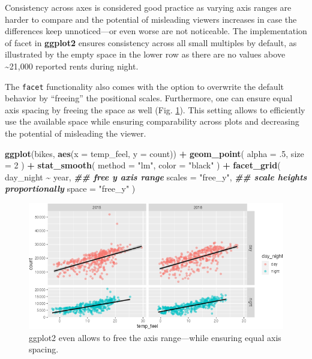 \documentclass[
]{krantz}
\makeatletter
\newenvironment{Shaded}{\begin{snugshade}}{\end{snugshade}}
\newcommand{\AttributeTok}[1]{\textcolor[rgb]{0.27,0.27,0.27}{#1}}
\newcommand{\DecValTok}[1]{\textcolor[rgb]{0.06,0.06,0.06}{#1}}
\newcommand{\DocumentationTok}[1]{\textcolor[rgb]{0.37,0.37,0.37}{\textbf{\textit{#1}}}}
\newcommand{\FunctionTok}[1]{\textcolor[rgb]{0.27,0.27,0.27}{\textbf{#1}}}
\newcommand{\NormalTok}[1]{#1}
\newcommand{\SpecialCharTok}[1]{\textcolor[rgb]{0.43,0.43,0.43}{\textbf{#1}}}
\newcommand{\StringTok}[1]{\textcolor[rgb]{0.5,0.5,0.5}{#1}}
\newenvironment{kframe}{%
\medskip{}
\setlength{\fboxsep}{.8em}
 \def\at@end@of@kframe{}%
 \ifinner\ifhmode%
  \def\at@end@of@kframe{\end{minipage}}%
  \begin{minipage}{\columnwidth}%
 \fi\fi%
 \def\FrameCommand##1{\hskip\@totalleftmargin \hskip-\fboxsep
 \colorbox{shadecolor}{##1}\hskip-\fboxsep
     \hskip-\linewidth \hskip-\@totalleftmargin \hskip\columnwidth}%
 \MakeFramed {\advance\hsize-\width
   \@totalleftmargin\z@ \linewidth\hsize
   \@setminipage}}%
 {\par\unskip\endMakeFramed%
 \at@end@of@kframe}
\renewenvironment{Shaded}{\begin{kframe}}{\end{kframe}}
\makeatother
\begin{document}
Consistency across axes is considered good practice as varying axis ranges are harder to compare and the potential of misleading viewers increases in case the differences keep unnoticed---or even worse are not noticeable. The implementation of facet in \textbf{ggplot2} ensures consistency across all small multiples by default, as illustrated by the empty space in the lower row as there are no values above \textasciitilde21,000 reported rents during night.

The \texttt{facet} functionality also comes with the option to overwrite the default behavior by ``freeing'' the positional scales. Furthermore, one can ensure equal axis spacing by freeing the space as well (Fig. \ref{fig:04ggplotFacetGrid}). This setting allows to efficiently use the available space while ensuring comparability across plots and decreasing the potential of misleading the viewer.

\begin{Shaded}
\begin{Highlighting}[]
\FunctionTok{ggplot}\NormalTok{(bikes, }\FunctionTok{aes}\NormalTok{(}\AttributeTok{x =}\NormalTok{ temp\_feel, }\AttributeTok{y =}\NormalTok{ count)) }\SpecialCharTok{+} 
  \FunctionTok{geom\_point}\NormalTok{(}
    \AttributeTok{alpha =}\NormalTok{ .}\DecValTok{5}\NormalTok{, }\AttributeTok{size =} \DecValTok{2}
\NormalTok{  ) }\SpecialCharTok{+} 
  \FunctionTok{stat\_smooth}\NormalTok{(}
    \AttributeTok{method =} \StringTok{"lm"}\NormalTok{, }\AttributeTok{color =} \StringTok{"black"}
\NormalTok{  ) }\SpecialCharTok{+}
  \FunctionTok{facet\_grid}\NormalTok{(}
\NormalTok{    day\_night }\SpecialCharTok{\textasciitilde{}}\NormalTok{ year, }
    \DocumentationTok{\#\# free y axis range}
    \AttributeTok{scales =} \StringTok{"free\_y"}\NormalTok{, }
    \DocumentationTok{\#\# scale heights proportionally}
    \AttributeTok{space =} \StringTok{"free\_y"}
\NormalTok{  )}
\end{Highlighting}
\end{Shaded}

\begin{figure}
\centering
\includegraphics{bookdown_files/figure-latex/04ggplotFacetGrid-1.png}
\caption{\label{fig:04ggplotFacetGrid}ggplot2 even allows to free the axis range---while ensuring equal axis spacing.}
\end{figure}
\end{document}
